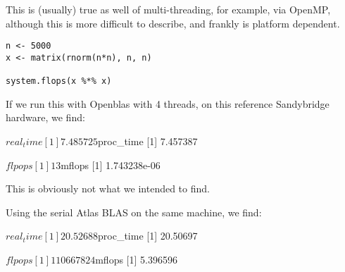 This is (usually) true as well of multi-threading, for example, via OpenMP, 
although this is more difficult to describe, and frankly is platform dependent.

\begin{lstlisting}[language=rr]
n <- 5000
x <- matrix(rnorm(n*n), n, n)

system.flops(x %*% x)
\end{lstlisting}

If we run this with Openblas with 4 threads, on this reference Sandybridge 
hardware, we find:
\begin{Output}
$real_time
[1] 7.485725

$proc_time
[1] 7.457387

$flpops
[1] 13

$mflops
[1] 1.743238e-06
\end{Output}

This is obviously not what we intended to find.  

Using the serial Atlas BLAS on the same machine, we find:
\begin{Output}
$real_time
[1] 20.52688

$proc_time
[1] 20.50697

$flpops
[1] 110667824

$mflops
[1] 5.396596
\end{Output}


